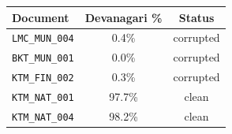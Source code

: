 \begin{tabular}{lcc}
\toprule
\textbf{Document} & \textbf{Devanagari \%} & \textbf{Status} \\
\midrule
\texttt{LMC\_MUN\_004} & 0.4\% & corrupted \\
\texttt{BKT\_MUN\_001} & 0.0\% & corrupted \\
\texttt{KTM\_FIN\_002} & 0.3\% & corrupted \\
\texttt{KTM\_NAT\_001} & 97.7\% & clean \\
\texttt{KTM\_NAT\_004} & 98.2\% & clean \\
\bottomrule
\end{tabular}

